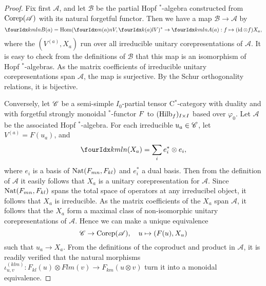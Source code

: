 \begin{proof} Fix first $\mathscr{A}$, and let $\mathscr{B}$ be the partial Hopf $^*$-algebra constructed from $\mathrm{Corep}(\mathscr{A})$ with its natural forgetful functor. Then we have a map $\mathscr{B} \rightarrow \mathscr{A}$ by \[ \Gr{B}{k}{l}{m}{n}(a) = \Hom(\Gr{V}{}{(a)}{m}{n},\Gr{V}{}{(a)}{k}{l})^* \rightarrow \Gr{A}{k}{l}{m}{n}(a):  f \mapsto (\id\otimes f)X_a,\] where the $(V^{(a)},X_a)$ run over all irreducible unitary corepresentations of $\mathscr{A}$. It is easy to check from the definitions of $\mathscr{B}$ that this map is an isomorphism of Hopf $^*$-algebras. As the matrix coefficients of irreducible unitary corepresentations span $\mathscr{A}$, the map is surjective. By the Schur orthogonality relations, it is bijective.

Conversely, let $\mathscr{C}$ be a semi-simple $I_0$-partial tensor C$^*$-category with duality and with forgetful strongly monoidal $^*$-functor $F$ to $(\mathrm{Hilb}_f)_{I\times I}$ based over $\varphi_0$. Let $\mathscr{A}$ be the associated Hopf $^*$-algebra. For each irreducible $u_a \in \mathscr{C}$, let $V^{(a)} = F(u_a)$, and \[\Gr{(X_a)}{k}{l}{m}{n} = \sum_i e_i^*\otimes e_i,\] where $e_i$ is a basis of $\operatorname{\mathrm{Nat}}(F_{mn},F_{kl})$ and $e_i^*$ a dual basis. Then from the definition of $\mathscr{A}$ it easily follows that $X_a$ is a unitary corepresentation for $\mathscr{A}$. Since $\operatorname{\mathrm{Nat}}(F_{mn},F_{kl})$ spans the total space of operators at any irreducibel object, it follows that $X_a$ is irreducible. As the matrix coefficients of the $X_a$ span $\mathscr{A}$, it follows that the $X_a$ form a maximal class of non-isomorphic unitary corepresentations of $\mathscr{A}$. Hence we can make a unique equivalence \[\mathscr{C}\rightarrow \mathrm{Corep}(\mathscr{A}), \quad u \mapsto (F(u),X_u)\] such that $u_a\rightarrow X_a$. From the definitions of the coproduct and product in $\mathscr{A}$, it is readily verified that the natural morphisms $\iota^{(klm)}_{u,v}:F_{kl}(u)\otimes F{lm}(v)\rightarrow F_{km}(u\otimes v)$ turn it into a monoidal equivalence. 
\end{proof}
